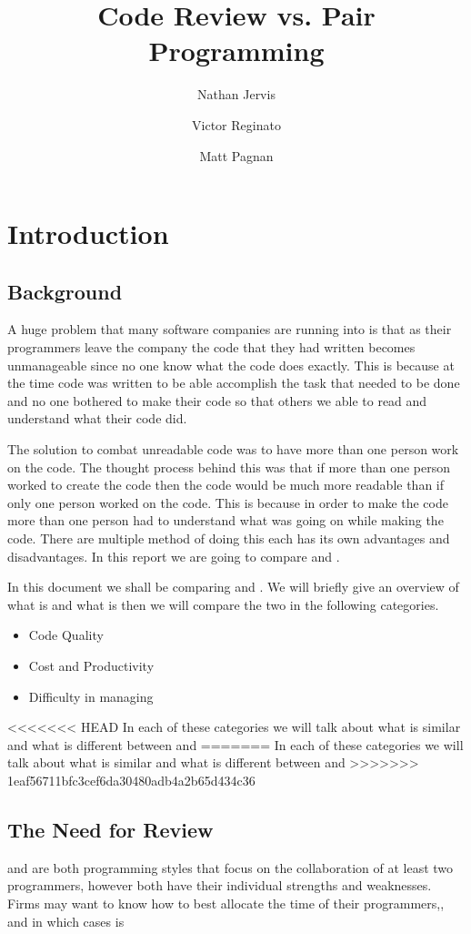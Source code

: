 \documentclass{article}
\title{Code Review vs. Pair Programming}
\author{Nathan Jervis \and Victor Reginato \and Matt Pagnan}
\begin{document}
\maketitle

\tableofcontents

\section{Introduction}

\subsection{Background}
A huge problem that many software companies are running into is that as their programmers leave the company the code that they had written becomes unmanageable since no one know what the code does exactly. This is because at the time code was written to be able accomplish the task that needed to be done and no one bothered to make their code so that others we able to read and understand what their code did.

The solution to combat unreadable code was to have more than one person work on the code. The thought process behind this was that if more than one person worked to create the code then the code would be much more readable than if only one person worked on the code. This is because in order to make the code more than one person had to understand what was going on while making the code. There are multiple method of doing this each has its own advantages and disadvantages. In this report we are going to compare \PP and \CR.

In this document we shall be comparing \PP and \CR. We will briefly give an overview of what \PP is and what \CR is then we will compare the two in the following categories.
\begin{itemize}
\item Code Quality
\item Cost and Productivity
\item Difficulty in managing
\end{itemize}

<<<<<<< HEAD
In each of these categories we will talk about what is similar and what is different between \PP and \CR  \PR
=======
In each of these categories we will talk about what is similar and what is different between \PP and \CR 
>>>>>>> 1eaf56711bfc3cef6da30480adb4a2b65d434c36

\subsection{The Need for Review}
\PP and \CR are both programming styles that focus on the collaboration of at least two programmers, however both have their individual strengths and weaknesses. Firms may want to know how to best allocate the time of their programmers,, and in which cases \PP is 
\end{document}
